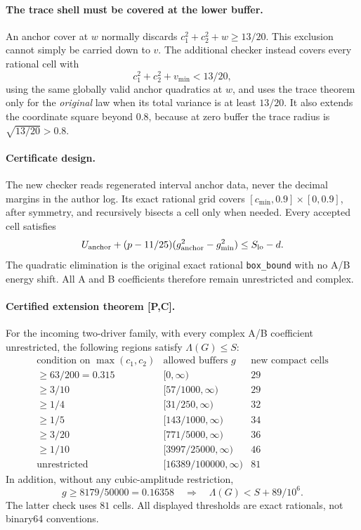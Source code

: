 \paragraph{The trace shell must be covered at the lower buffer.}
An anchor cover at \(w\) normally discards
\(c_1^2+c_2^2+w\ge13/20\). This exclusion cannot simply be
carried down to \(v\). The additional checker instead covers every
rational cell with
\[
 c_1^2+c_2^2+v_{\min}<13/20,
\]
using the same globally valid anchor quadratics at \(w\), and uses
the trace theorem only for the \emph{original} law when its total
variance is at least \(13/20\). It also extends the coordinate
square beyond \(0.8\), because at zero buffer the trace radius is
\(\sqrt{13/20}>0.8\).

\paragraph{Certificate design.}
The new checker reads regenerated interval anchor data, never the
decimal margins in the author log. Its exact rational grid covers
\([c_{\min},0.9]\times[0,0.9]\), after symmetry, and recursively
bisects a cell only when needed. Every accepted cell satisfies
\[
 U_{\rm anchor}+(p-11/25)(g_{\rm anchor}^2-g_{\min}^2)
 \le S_{\rm lo}-d.
\]
The quadratic elimination is the original exact rational
\texttt{box\_bound} with no A/B energy shift. All A and B coefficients
therefore remain unrestricted and complex.

\paragraph{Certified extension theorem [P,C].}
For the incoming two-driver family, with every complex A/B coefficient
unrestricted, the following regions satisfy \(\Lambda(G)\le S\):
\[
\begin{array}{c|c|c}
 \text{condition on }\max(c_1,c_2)&
 \text{allowed buffers }g&\text{new compact cells}\\ \hline
 \ge63/200=0.315&[0,\infty)&29\\
 \ge3/10&[57/1000,\infty)&29\\
 \ge1/4&[31/250,\infty)&32\\
 \ge1/5&[143/1000,\infty)&34\\
 \ge3/20&[771/5000,\infty)&36\\
 \ge1/10&[3997/25000,\infty)&46\\
 \text{unrestricted}&[16389/100000,\infty)&81
\end{array}
\]
In addition, without any cubic-amplitude restriction,
\[
 \boxed{\quad g\ge8179/50000=0.16358
   \quad\Longrightarrow\quad \Lambda(G)<S+89/10^6.\quad}
\]
The latter check uses \(81\) cells. All displayed thresholds are exact
rationals, not binary64 conventions.

